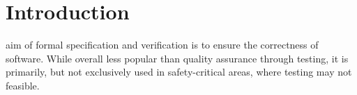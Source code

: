 \documentclass[11pt,journal]{IEEEtran}
\begin{document}
	
	\IEEEpeerreviewmaketitle
	
	
	
	\section{Introduction}
	 aim of formal specification and verification is to ensure the correctness of software. While overall less popular than quality assurance through testing, it is primarily, but not exclusively used in safety-critical areas, where testing may not feasible.
	

	
\end{document}
